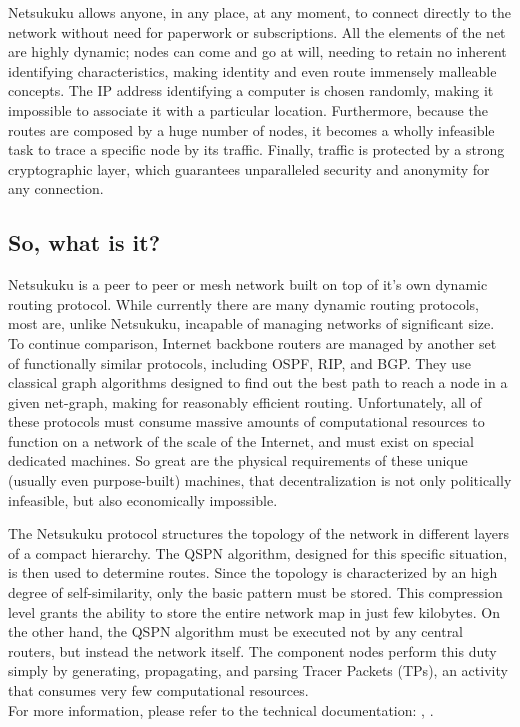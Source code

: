 \documentclass[a4paper]{article}
\begin{document}
Netsukuku allows anyone, in any place, at any moment, to connect directly to the network
without need for paperwork or subscriptions. 
All the elements of the net are highly dynamic; nodes can come and go at will, needing to
retain no inherent identifying characteristics, making identity and even route immensely
malleable concepts.  The IP address identifying a computer is chosen randomly, making it
impossible to associate it with a particular location.  Furthermore, because the routes 
are composed by a huge number of nodes, it becomes a wholly infeasible task to trace
a specific node by its traffic.  Finally, traffic is protected by a strong cryptographic
layer\cite{carciofo}, which guarantees unparalleled security and anonymity for any connection.

\subsection{So, what is it?}

Netsukuku is a peer to peer or mesh network built on top of it's own dynamic routing protocol.
While currently there are many dynamic routing protocols, most are, unlike Netsukuku, incapable
of managing networks of significant size.  To continue comparison, Internet backbone routers
are managed by another set of functionally similar protocols, including OSPF, RIP, and BGP.
They use classical graph algorithms designed to find out the best path to reach a node in a 
given net-graph, making for reasonably efficient routing.  Unfortunately, all of these 
protocols must consume massive amounts of computational resources to function on a network
of the scale of the Internet, and must exist on special dedicated machines. 
So great are the physical requirements of these unique (usually even purpose-built) machines,
that decentralization is not only politically infeasible, but also economically impossible.

The Netsukuku protocol structures the topology of the network in different
layers of a compact hierarchy\cite{ntktopology}. The  
QSPN\cite{qspndoc} algorithm, designed for this
specific situation, is then used to determine routes. Since the topology is
characterized by an high degree of self-similarity, only the basic pattern must be stored.
This compression level grants the ability to store the entire network map in
just few kilobytes. On the other hand, the QSPN algorithm must be executed not by 
any central routers, but instead the network itself.  The component nodes perform this 
duty simply by generating, propagating, and parsing Tracer Packets (TPs), an activity 
that consumes very few computational resources.\\
For more information, please refer to the technical
documentation: \cite{ntktopology}, \cite{qspndoc}.
\end{document}
